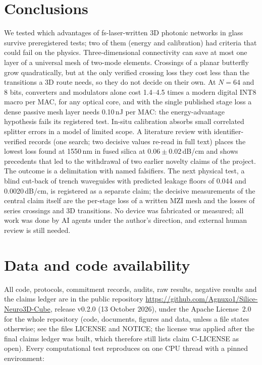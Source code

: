 \documentclass[11pt,a4paper]{article}
\newcommand{\dBcm}{\,dB/cm\xspace}
\begin{document}
\section{Conclusions}
\label{sec:conclusions}

We tested which advantages of fs-laser-written 3D photonic networks in glass survive preregistered tests; two of them (energy and calibration) had criteria that could fail on the physics. Three-dimensional connectivity can save at most one layer of a universal mesh of two-mode elements. Crossings of a planar butterfly grow quadratically, but at the only verified crossing loss they cost less than the transitions a 3D route needs, so they do not decide on their own. At $N=64$ and 8 bits, converters and modulators alone cost 1.4--4.5 times a modern digital INT8 macro per MAC, for any optical core, and with the single published stage loss a dense passive mesh layer needs 0.10\,nJ per MAC: the energy-advantage hypothesis fails its registered test. In-situ calibration absorbs small correlated splitter errors in a model of limited scope. A literature review with identifier-verified records (one search; two decisive values re-read in full text) places the lowest loss found at 1550\,nm in fused silica at $0.06\pm0.02$\dBcm and shows precedents that led to the withdrawal of two earlier novelty claims of the project. The outcome is a delimitation with named falsifiers. The next physical test, a blind cut-back of trench waveguides with predicted leakage floors of 0.044 and 0.0020\dBcm, is registered as a separate claim; the decisive measurements of the central claim itself are the per-stage loss of a written MZI mesh and the losses of series crossings and 3D transitions. No device was fabricated or measured; all work was done by AI agents under the author's direction, and external human review is still needed.

\section*{Data and code availability}

All code, protocols, commitment records, audits, raw results, negative results and the claims ledger are in the public repository \url{https://github.com/Agnuxo1/Silice-Neuro3D-Cube}, release v0.2.0 (13 October 2026), under the Apache License~2.0 for the whole repository (code, documents, figures and data, unless a file states otherwise; see the files LICENSE and NOTICE; the license was applied after the final claims ledger was built, which therefore still lists claim C-LICENSE as open). Every computational test reproduces on one CPU thread with a pinned environment:
\end{document}
